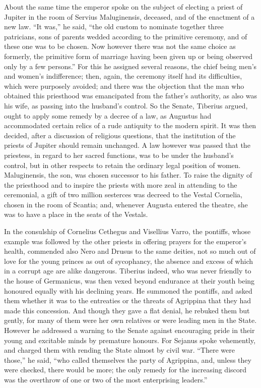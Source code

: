
About the same time the emperor spoke on the subject of electing a priest of Jupiter in the room of Servius Maluginensis, deceased, and of the enactment of a new law. ``It was,'' he said, ``the old custom to nominate together three patricians, sons of parents wedded according to the primitive ceremony, and of these one was to be chosen. Now however there was not the same choice as formerly, the primitive form of marriage having been given up or being observed only by a few persons.'' For this he assigned several reasons, the chief being men's and women's indifference; then, again, the ceremony itself had its difficulties, which were purposely avoided; and there was the objection that the man who obtained this priesthood was emancipated from the father's authority, as also was his wife, as passing into the husband's control. So the Senate, Tiberius argued, ought to apply some remedy by a decree of a law, as Augustus had accommodated certain relics of a rude antiquity to the modern spirit. It was then decided, after a discussion of religious questions, that the institution of the priests of Jupiter should remain unchanged. A law however was passed that the priestess, in regard to her sacred functions, was to be under the husband's control, but in other respects to retain the ordinary legal position of women. Maluginensis, the son, was chosen successor to his father. To raise the dignity of the priesthood and to inspire the priests with more zeal in attending to the ceremonial, a gift of two million sesterces was decreed to the Vestal Cornelia, chosen in the room of Scantia; and, whenever Augusta entered the theatre, she was to have a place in the seats of the Vestals.


In the consulship of Cornelius Cethegus and Visellius Varro, the pontiffs, whose example was followed by the other priests in offering prayers for the emperor's health, commended also Nero and Drusus to the same deities, not so much out of love for the young princes as out of sycophancy, the absence and excess of which in a corrupt age are alike dangerous. Tiberius indeed, who was never friendly to the house of Germanicus, was then vexed beyond endurance at their youth being honoured equally with his declining years. He summoned the pontiffs, and asked them whether it was to the entreaties or the threats of Agrippina that they had made this concession. And though they gave a flat denial, he rebuked them but gently, for many of them were her own relatives or were leading men in the State. However he addressed a warning to the Senate against encouraging pride in their young and excitable minds by premature honours. For Sejanus spoke vehemently, and charged them with rending the State almost by civil war. ``There were those,'' he said, ``who called themselves the party of Agrippina, and, unless they were checked, there would be more; the only remedy for the increasing discord was the overthrow of one or two of the most enterprising leaders.''

